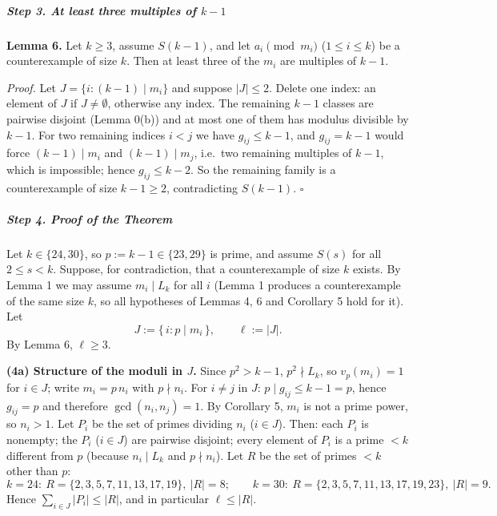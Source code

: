 \subparagraph{\texorpdfstring{Step 3. At least three multiples of
\(k-1\)}{Step 3. At least three multiples of k-1}}\label{step-3.-at-least-three-multiples-of-k-1}

\textbf{Lemma 6.} Let \(k\ge3\), assume \(S(k-1)\), and let
\(a_i\pmod{m_i}\) (\(1\le i\le k\)) be a counterexample of size \(k\).
Then at least three of the \(m_i\) are multiples of \(k-1\).

\emph{Proof.} Let \(J=\{i:(k-1)\mid m_i\}\) and suppose \(|J|\le2\).
Delete one index: an element of \(J\) if \(J\ne\emptyset\), otherwise
any index. The remaining \(k-1\) classes are pairwise disjoint (Lemma
0(b)) and at most one of them has modulus divisible by \(k-1\). For two
remaining indices \(i<j\) we have \(g_{ij}\le k-1\), and \(g_{ij}=k-1\)
would force \((k-1)\mid m_i\) and \((k-1)\mid m_j\), i.e.~two remaining
multiples of \(k-1\), which is impossible; hence \(g_{ij}\le k-2\). So
the remaining family is a counterexample of size \(k-1\ge2\),
contradicting \(S(k-1)\). \(\square\)

\subparagraph{Step 4. Proof of the
Theorem}\label{step-4.-proof-of-the-theorem}

Let \(k\in\{24,30\}\), so \(p:=k-1\in\{23,29\}\) is prime, and assume
\(S(s)\) for all \(2\le s<k\). Suppose, for contradiction, that a
counterexample of size \(k\) exists. By Lemma 1 we may assume
\(m_i\mid L_k\) for all \(i\) (Lemma 1 produces a counterexample of the
same size \(k\), so all hypotheses of Lemmas 4, 6 and Corollary 5 hold
for it). Let \[J:=\{\,i: p\mid m_i\,\},\qquad \ell:=|J|.\] By Lemma 6,
\(\ell\ge3\).

\textbf{(4a) Structure of the moduli in \(J\).} Since \(p^2>k-1\),
\(p^2\nmid L_k\), so \(v_p(m_i)=1\) for \(i\in J\); write \(m_i=p\,n_i\)
with \(p\nmid n_i\). For \(i\ne j\) in \(J\): \(p\mid g_{ij}\le k-1=p\),
hence \(g_{ij}=p\) and therefore \(\gcd(n_i,n_j)=1\). By Corollary 5,
\(m_i\) is not a prime power, so \(n_i>1\). Let \(P_i\) be the set of
primes dividing \(n_i\) (\(i\in J\)). Then: each \(P_i\) is nonempty;
the \(P_i\) (\(i\in J\)) are pairwise disjoint; every element of \(P_i\)
is a prime \(<k\) different from \(p\) (because \(n_i\mid L_k\) and
\(p\nmid n_i\)). Let \(R\) be the set of primes \(<k\) other than \(p\):
\[k=24:\ R=\{2,3,5,7,11,13,17,19\},\ |R|=8;\qquad k=30:\ R=\{2,3,5,7,11,13,17,19,23\},\ |R|=9 .\]
Hence \(\sum_{i\in J}|P_i|\le|R|\), and in particular \(\ell\le|R|\).

